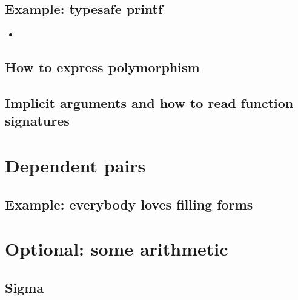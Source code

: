 \documentclass{beamer}
\begin{document}
\subsection{Example: typesafe printf}

\begin{frame}{}
	\begin{itemize}
		\item 
	\end{itemize}
	\end{frame}

\subsection{How to express polymorphism}

\subsection{Implicit arguments and how to read function signatures}

\section{Dependent pairs}

\subsection{Example: everybody loves filling forms}

\section{Optional: some arithmetic}

\subsection{Sigma}
\end{document}

